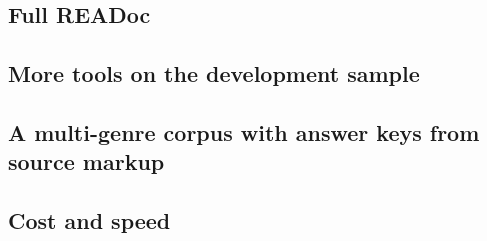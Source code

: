 \subsection{Full READoc}\label{sec:full}
\begin{table}[t]\centering
  \caption{Heading Tree TEDS on all READoc documents with headings (run of 20 Oct, before the README and papers fixes), with published results.}
  \label{tab:full}
\end{table}
\subsection{More tools on the development sample}\label{sec:sample}
\begin{table}[t]\centering
  \caption{Heading Tree TEDS on the 200-document development sample (98 arXiv, 100 GitHub).}
  \label{tab:sample}
\end{table}
\subsection{A multi-genre corpus with answer keys from source markup}\label{sec:corpus}
\begin{table}[t]\centering
  \caption{Precision, recall, F1 and level agreement on the corpus (19 Oct runs).}\label{tab:corpus}
\end{table}
\begin{table}[t]\centering
  \caption{F1 and cost per 100 pages by model, 29 non-scanned corpus documents.}\label{tab:models}
\end{table}
\subsection{Cost and speed}\label{sec:cost}
\begin{table}[t]\centering
  \caption{Cost per 1,000 pages and measured run totals.}\label{tab:cost}
\end{table}

